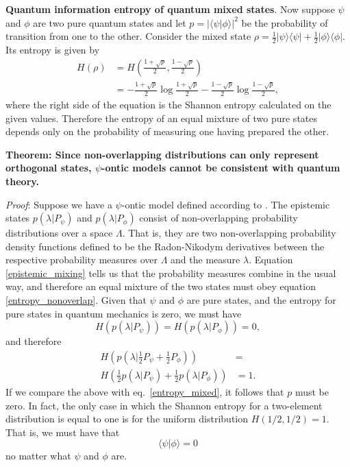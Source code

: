 \documentclass[10pt,twocolumn, nofootinbib]{revtex4-2}
\begin{document}
\textbf{Quantum information entropy of quantum mixed states}. Now suppose $\psi$ and $\phi$ are two pure quantum states and let $p = | \langle \psi | \phi \rangle |^2$ be the probability of transition from one to the other. Consider the mixed state $\rho = \frac{1}{2} | \psi \rangle \langle \psi | + \frac{1}{2} | \phi \rangle \langle \phi |$. Its entropy is given by
\begin{equation}\label{entropy_mixed}
	\begin{aligned}
	H(\rho) &= H\left(\frac{1+\sqrt{p}}{2}, \frac{1-\sqrt{p}}{2}\right) \\
	&= - \frac{1+\sqrt{p}}{2} \log \frac{1+\sqrt{p}}{2} - \frac{1-\sqrt{p}}{2} \log \frac{1-\sqrt{p}}{2} ,
	\end{aligned}
\end{equation}
where the right side of the equation is the Shannon entropy calculated on the given values. Therefore the entropy of an equal mixture of two pure states depends only on the probability of measuring one having prepared the other.

\textbf{Theorem: Since non-overlapping distributions can only represent orthogonal states, $\psi$-ontic models cannot be consistent with quantum theory.}

\emph{Proof}: Suppose we have a $\psi$-ontic model defined according to \cite{Harrigan:2010}. The epistemic states $p(\lambda|P_\psi)$ and $p(\lambda|P_\phi)$ consist of non-overlapping probability distributions over a space $\Lambda$. That is, they are two non-overlapping probability density functions defined to be the Radon-Nikodym derivatives between the respective probability measures over $\Lambda$ and the measure $\lambda$. Equation \ref{epistemic_mixing} tells us that the probability measures combine in the usual way, and therefore an equal mixture of the two states must obey equation \ref{entropy_nonoverlap}. Given that $\psi$ and $\phi$ are pure states, and the entropy for pure states in quantum mechanics is zero, we must have
\begin{equation}\label{entropy_pure}
	H(p(\lambda|P_\psi)) = H(p(\lambda|P_\phi)) = 0,
\end{equation}
and therefore
\begin{equation}\label{required_entropy}
	\begin{aligned}
		H\left(p(\lambda|\frac{1}{2}P_\psi + \frac{1}{2}P_\phi)\right) &= \\
		H\left(\frac{1}{2}p(\lambda|P_\psi) + \frac{1}{2}p(\lambda|P_\phi)\right) 
		&= 1.
	\end{aligned}
\end{equation}
If we compare the above with eq.~\ref{entropy_mixed}, it follows that $p$ must be zero. In fact, the only case in which the Shannon entropy for a two-element distribution is equal to one is for the uniform distribution $H(1/2, 1/2) = 1$.  That is, we must have that
\begin{equation}\label{orthogonal}
	\langle \psi | \phi \rangle = 0
\end{equation}
no matter what $\psi$ and $\phi$ are.
\end{document}
